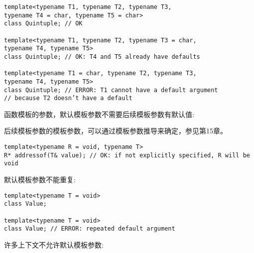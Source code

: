 \begin{lstlisting}[style=styleCXX]
template<typename T1, typename T2, typename T3,
typename T4 = char, typename T5 = char>
class Quintuple; // OK

template<typename T1, typename T2, typename T3 = char,
typename T4, typename T5>
class Quintuple; // OK: T4 and T5 already have defaults

template<typename T1 = char, typename T2, typename T3,
typename T4, typename T5>
class Quintuple; // ERROR: T1 cannot have a default argument
// because T2 doesn’t have a default
\end{lstlisting}

函数模板的参数，默认模板参数不需要后续模板参数有默认值:

\begin{tcolorbox}[colback=webgreen!5!white,colframe=webgreen!75!black]
\hspace*{0.75cm}后续模板参数的模板参数，可以通过模板参数推导来确定，参见第15章。
\end{tcolorbox}

\begin{lstlisting}[style=styleCXX]
template<typename R = void, typename T>
R* addressof(T& value); // OK: if not explicitly specified, R will be void
\end{lstlisting}

默认模板参数不能重复:

\begin{lstlisting}[style=styleCXX]
template<typename T = void>
class Value;

template<typename T = void>
class Value; // ERROR: repeated default argument
\end{lstlisting}

许多上下文不允许默认模板参数:

